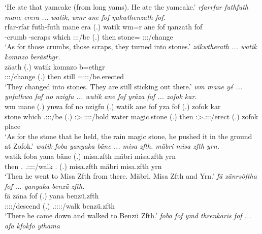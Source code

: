 \begin{exe}
	\trans `He ate that yamcake (from long yams). He ate the yamcake.'
	\emph{rfarrfar futhfuth mane erera ... watik, wmr ane fof ŋakwthenzath fof.}\\
	\gll rfar-rfar futh-futh mane era (.) watik wm=r ane fof ŋanzath fof\\ 
	\Redup-crumb{} \Redup-scraps which \Sg:\Sbj:\Pst:\Ipfv/be (.) then stone={\Purp} {\Dem} {\Emph} \Stpl:\Sbj:\Pst:\Ipfv/change {\Emph}\\
	\trans `As for those crumbs, those scraps, they turned into stones.'
	\emph{zäkwtherath ... watik komnzo berästhgr.}\\
	\gll zäath (.) watik komnzo b=ethgr\\ 
	\Stpl:\Sbj:\Pst:\Pfv/change (.) then still \Med=\Stpl:\Sbj:\Nonpast:\Stat/be.erected\\
	\trans `They changed into stones. They are still sticking out there.'
	\emph{wm mane yé ... ynfathwa fof no nzigfu ... watik ane fof yräza fof ... zofok kar.}\\
	\gll wm mane  (.) ynwa fof no nzigfu (.) watik ane fof yza fof (.) zofok kar\\ 
	stone which \Tsg.\Masc:\Sbj:\Nonpast:\Ipfv/be (.) \Sg:\Sbj>\Tsg.\Masc:\Obj:\Pst:\Ipfv:\Venit/hold {\Emph} water magic.stone (.) then {\Dem} {\Emph} \Sg:\Sbj>\Tsg.\Masc:\Obj:\Nonpast:\Ipfv/erect {\Emph} (.) zofok place\\
	\trans `As for the stone that he held, the rain magic stone, he pushed it in the ground at Zofok.'
	\emph{watik foba yanyaka bäne ... misa zfth. mäbri misa zfth yrn.}\\
	\gll watik foba yana bäne (.) {misa.zfth} mäbri {misa.zfth} yrn\\ 
	then \Dist.{\Abl} \Tsg.\Masc:\Sbj:\Pst:\Ipfv:\Venit/walk \Recog.{\Abs} (.) {misa.zfth} mäbri {misa.zfth} yrn\\
	\trans `Then he went to Misa Zfth from there. Mäbri, Misa Zfth and Yrn.'
\newpage 
{} 
	\emph{fä zänrsöftha fof ... yanyaka benzü zfth.}\\
	\gll fä zäna fof (.) yana {benzü.zfth}\\ 
	{\Dist} \Sg:\Sbj:\Pst:\Pfv:\Venit/descend {\Emph} (.) \Tsg.\Masc:\Sbj:\Pst:\Ipfv:\Venit/walk {benzü.zfth}\\
	\trans `There he came down and walked to Benzü Zfth.'
	\emph{foba fof ymd threnkaris fof ... afa kfokfo ythama}\\

\end{exe}
